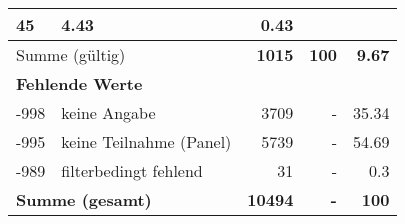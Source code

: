 \begin{longtable}{lXrrr}
       \num{45} &
       \num[round-mode=places,round-precision=2]{4,43} &
         \num[round-mode=places,round-precision=2]{0,43} \\
     \midrule
     \multicolumn{2}{l}{Summe (gültig)} &
       \textbf{\num{1015}} &
     \textbf{100} &
       \textbf{\num[round-mode=places,round-precision=2]{9,67}} \\
     \multicolumn{5}{l}{\textbf{Fehlende Werte}}\\
       -998 &
       keine Angabe &
         \num{3709} &
        - &
         \num[round-mode=places,round-precision=2]{35,34} \\
       -995 &
       keine Teilnahme (Panel) &
         \num{5739} &
        - &
         \num[round-mode=places,round-precision=2]{54,69} \\
       -989 &
       filterbedingt fehlend &
         \num{31} &
        - &
         \num[round-mode=places,round-precision=2]{0,3} \\
     \midrule
     \multicolumn{2}{l}{\textbf{Summe (gesamt)}} &
          \textbf{\num{10494}} &
        \textbf{-} &
        \textbf{100} \\
     \bottomrule
     \end{longtable}
     
